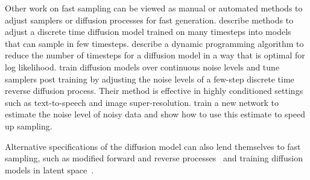 \documentclass[hidelinks]{article} %
\begin{document}
Other work on fast sampling can be viewed as manual or automated methods to adjust samplers or diffusion processes for fast generation. \citet{nichol2021improvedddpm,kong2021fast} describe methods to adjust a discrete time diffusion model trained on many timesteps into models that can sample in few timesteps. \citet{watson2021learning} describe a dynamic programming algorithm to reduce the number of timesteps for a diffusion model in a way that is optimal for log likelihood.
\citet{chen2020wavegrad,saharia2021image,ho2021cascaded} train diffusion models over continuous noise levels and tune samplers post training by adjusting the noise levels of a few-step discrete time reverse diffusion process. Their method is effective in highly conditioned settings such as text-to-speech and image super-resolution. \citet{san2021noise} train a new network to estimate the noise level of noisy data and show how to use this estimate to speed up sampling.

Alternative specifications of the diffusion model can also lend themselves to fast sampling, such as modified forward and reverse processes~\citep{nachmani2021non,lam2021bilateral} and training diffusion models in latent space~\citep{vahdat2021score}.
\end{document}
